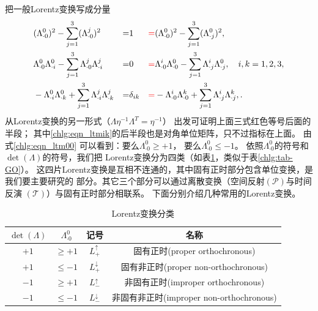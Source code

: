 把一般Lorentz变换写成分量
\begin{align}
    & (\Lambda^{0}_{\cdot 0})^2 -\sum_{j=1}^{3} (\Lambda^{j}_{\cdot 0})^2 &= & 1
    &{\color{red} =}& (\Lambda^{0}_{\cdot 0})^2 -\sum_{j=1}^{3} ({\Lambda^0_{\cdot j}})^2 , \label{chlg:eqn_ltm00} \\
    & \Lambda^{0}_{\cdot 0} \Lambda^{0}_{\cdot i} - \sum_{j=1}^{3} \Lambda^{j}_{\cdot 0}
    \Lambda^{j}_{\cdot i} &= &0 &{\color{red} =}& \Lambda^{i}_{\cdot 0} \Lambda^{0}_{\cdot 0}
    - \sum_{j=1}^{3} \Lambda^{i}_{\cdot j}   \Lambda^{0}_{\cdot j},
    \quad i,k=1,2,3, \label{chlg:eqn_ltm0i}  \\
    & -\Lambda^{0}_{\cdot i} \Lambda^{0}_{\cdot k} + \sum_{j=1}^{3} \Lambda^{j}_{\cdot i}
    \Lambda^{j}_{\cdot k} &= &\delta_{ik} &{\color{red} =}& -\Lambda^{i}_{\cdot 0} \Lambda^{k}_{\cdot 0}
    + \sum_{j=1}^{3} \Lambda^{i}_{\cdot j}  \Lambda^{k}_{\cdot j},
    \label{chlg:eqn_ltmik} .
\end{align}
从Lorentz变换的另一形式（$\Lambda \eta^{-1}\Lambda ^T  =\eta^{-1}$）
出发可证明上面三式红色等号后面的半段；
其中\eqref{chlg:eqn_ltmik}的后半段也是对角单位矩阵，只不过指标在上面。
由式\eqref{chlg:eqn_ltm00} 可以看到：要么$\Lambda^{0}_{\cdot 0} \geqslant +1$，
要么$\Lambda^{0}_{\cdot 0} \leqslant -1$。
依照$\Lambda^{0}_{\cdot 0}$的符号和$\det(\Lambda)$的符号，我们把
Lorentz变换分为四类（如表\ref{chlg:tab_lorentz}，类似于表\ref{chlg:tab-GO}）。
这四片Lorentz变换是互相不连通的，其中固有正时部分包含单位变换，是我们要主要研究的
部分。其它三个部分可以通过离散变换（空间反射$(\mathcal{P})$与时间反演
$(\mathcal{T})$）与固有正时部分相联系。
下面分别介绍几种常用的Lorentz变换。


\begin{table}[!htb]
    \centering
    \caption{Lorentz变换分类} \label{chlg:tab_lorentz}
    \begin{tabular}{|c|c|c|c|}
        \hline
        $\det(\Lambda)$ & $\Lambda^{0}_{\cdot 0}$ & 记号 & 名称 \\ \hline
        $+1$ & $\geqslant +1$ &    $L^{\uparrow}_{+}$   & 固有正时(proper orthochronous) \\ \hline
        $+1$ & $\leqslant -1$ &    $L^{\downarrow}_{+}$ & 固有非正时(proper non-orthochronous) \\ \hline
        $-1$ & $\geqslant +1$ &    $L^{\uparrow}_{-}$   & 非固有正时(improper orthochronous) \\ \hline
        $-1$ & $\leqslant -1$ &    $L^{\downarrow}_{-}$ & 非固有非正时(improper non-orthochronous) \\ \hline
    \end{tabular}
\end{table}




